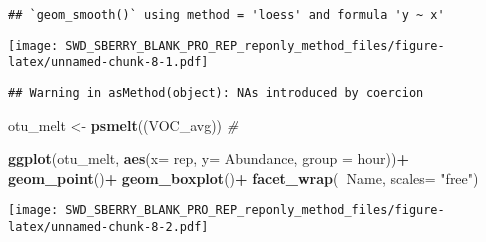 \documentclass[]{article}
\newenvironment{Shaded}{\begin{snugshade}}{\end{snugshade}}
\newcommand{\KeywordTok}[1]{\textcolor[rgb]{0.13,0.29,0.53}{\textbf{#1}}}
\newcommand{\DataTypeTok}[1]{\textcolor[rgb]{0.13,0.29,0.53}{#1}}
\newcommand{\StringTok}[1]{\textcolor[rgb]{0.31,0.60,0.02}{#1}}
\newcommand{\CommentTok}[1]{\textcolor[rgb]{0.56,0.35,0.01}{\textit{#1}}}
\newcommand{\OperatorTok}[1]{\textcolor[rgb]{0.81,0.36,0.00}{\textbf{#1}}}
\newcommand{\NormalTok}[1]{#1}
\begin{document}
\begin{verbatim}
## `geom_smooth()` using method = 'loess' and formula 'y ~ x'
\end{verbatim}

\texttt{[image: SWD\_SBERRY\_BLANK\_PRO\_REP\_reponly\_method\_files/figure-latex/unnamed-chunk-8-1.pdf]}

\begin{Shaded}
\end{Shaded}

\begin{verbatim}
## Warning in asMethod(object): NAs introduced by coercion
\end{verbatim}

\begin{Shaded}
\begin{Highlighting}[]
\NormalTok{otu_melt <-}\StringTok{  }\KeywordTok{psmelt}\NormalTok{((VOC_avg))}
\CommentTok{#}
  
\KeywordTok{ggplot}\NormalTok{(otu_melt, }\KeywordTok{aes}\NormalTok{(}\DataTypeTok{x=}\NormalTok{ rep, }\DataTypeTok{y=}\NormalTok{ Abundance, }\DataTypeTok{group =}\NormalTok{ hour))}\OperatorTok{+}
\StringTok{  }\KeywordTok{geom_point}\NormalTok{()}\OperatorTok{+}
\StringTok{  }\KeywordTok{geom_boxplot}\NormalTok{()}\OperatorTok{+}
\StringTok{  }\KeywordTok{facet_wrap}\NormalTok{(}\OperatorTok{~}\NormalTok{Name, }\DataTypeTok{scales=} \StringTok{"free"}\NormalTok{)}
\end{Highlighting}
\end{Shaded}

\texttt{[image: SWD\_SBERRY\_BLANK\_PRO\_REP\_reponly\_method\_files/figure-latex/unnamed-chunk-8-2.pdf]}
\end{document}

